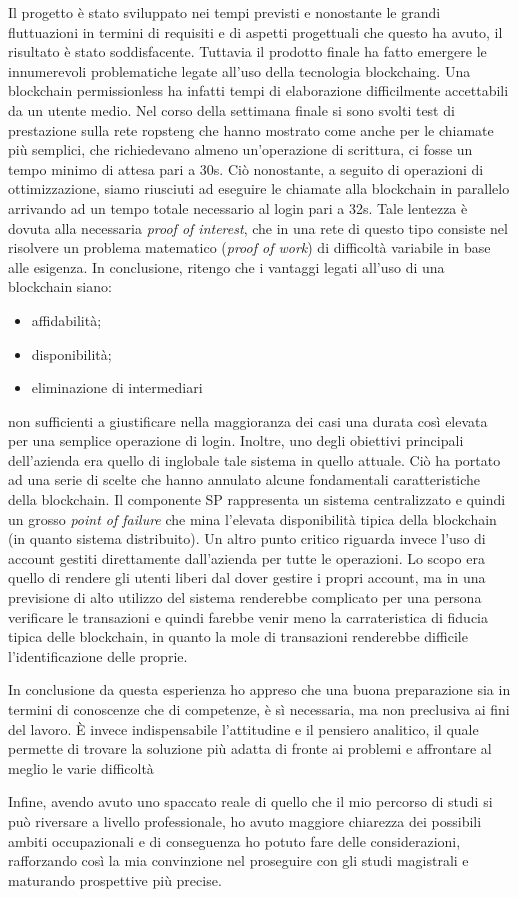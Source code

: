 Il progetto è stato sviluppato nei tempi previsti e nonostante le grandi fluttuazioni in termini di requisiti e di aspetti progettuali che questo ha avuto, il risultato è stato soddisfacente. Tuttavia il prodotto finale ha fatto emergere le innumerevoli problematiche legate all'uso della tecnologia \gls{blockchaing}. Una blockchain permissionless ha infatti tempi di elaborazione difficilmente accettabili da un utente medio. Nel corso della settimana finale si sono svolti test di prestazione sulla rete \gls{ropsteng} che hanno mostrato come anche per le chiamate più semplici, che richiedevano almeno un'operazione di scrittura, ci fosse un tempo minimo di attesa pari a 30s. Ciò nonostante, a seguito di operazioni di ottimizzazione, siamo riusciuti ad eseguire le chiamate alla blockchain in parallelo arrivando ad un tempo totale necessario al login pari a 32s. Tale lentezza è dovuta alla necessaria \emph{proof of interest}, che in una rete di questo tipo consiste nel risolvere un problema matematico (\emph{proof of work}) di difficoltà variabile in base alle esigenza.  
In conclusione, ritengo che i vantaggi legati all'uso di una blockchain siano:
\begin{itemize}
    \item affidabilità;
    \item disponibilità;
    \item eliminazione di intermediari
\end{itemize} 
non sufficienti a giustificare nella maggioranza dei casi una durata così elevata per una semplice operazione di login.
Inoltre, uno degli obiettivi principali dell'azienda era quello di inglobale tale sistema in quello attuale. Ciò ha portato ad una serie di scelte che hanno annulato alcune fondamentali caratteristiche della blockchain. Il componente SP rappresenta un sistema centralizzato e quindi un grosso \emph{point of failure} che mina l'elevata disponibilità tipica della blockchain (in quanto sistema distribuito). Un altro punto critico riguarda invece l'uso di account gestiti direttamente dall'azienda per tutte le operazioni. Lo scopo era quello di rendere gli utenti liberi dal dover gestire i propri account, ma in una previsione di alto utilizzo del sistema renderebbe complicato per una persona verificare le transazioni e quindi farebbe venir meno la carrateristica di fiducia tipica delle blockchain, in quanto la mole di transazioni renderebbe difficile l'identificazione delle proprie.

In conclusione da questa esperienza ho appreso che una buona preparazione sia in termini di conoscenze che di competenze, è sì necessaria, ma non preclusiva ai fini del lavoro. È invece indispensabile l'attitudine e il pensiero analitico, il quale permette di trovare la soluzione più adatta di fronte ai problemi e affrontare al meglio le varie difficoltà 

Infine, avendo avuto uno spaccato reale di quello che il mio percorso di studi si può riversare a livello professionale, ho avuto maggiore chiarezza dei possibili ambiti occupazionali e di conseguenza ho potuto fare delle considerazioni, rafforzando così la mia convinzione nel proseguire con gli studi magistrali e maturando prospettive più precise.